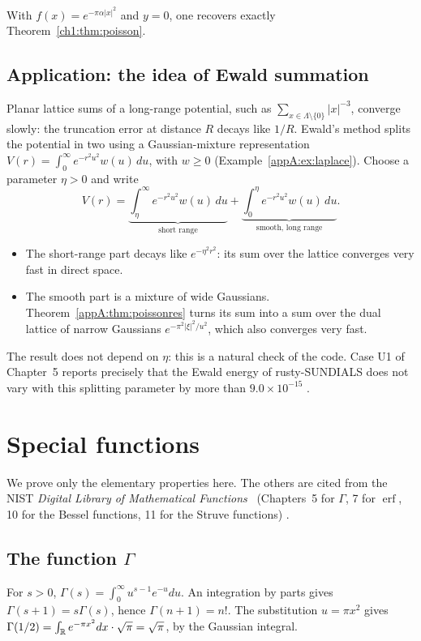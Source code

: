 With $f(x)=e^{-\pi\alpha|x|^2}$ and $y=0$, one recovers exactly Theorem~\ref{ch1:thm:poisson}.

\subsection{Application: the idea of Ewald summation}\label{appA:ssec:ewald}

Planar lattice sums of a long-range potential, such as $\sum_{x\in\Lambda\setminus\{0\}}|x|^{-3}$, converge
slowly: the truncation error at distance $R$ decays like $1/R$. Ewald's method splits the potential in two
using a Gaussian-mixture representation $V(r)=\int_0^\infty e^{-r^2u^2}w(u)\,du$, with $w\ge0$
(Example~\ref{appA:ex:laplace}). Choose a parameter $\eta>0$ and write
\[V(r)=\underbrace{\int_\eta^\infty e^{-r^2u^2}w(u)\,du}_{\text{short range}}+
\underbrace{\int_0^\eta e^{-r^2u^2}w(u)\,du}_{\text{smooth, long range}} .\]
\begin{itemize}
\item The short-range part decays like $e^{-\eta^2r^2}$: its sum over the lattice converges very fast in
direct space.
\item The smooth part is a mixture of wide Gaussians. Theorem~\ref{appA:thm:poissonres} turns its sum
into a sum over the dual lattice of narrow Gaussians $e^{-\pi^2|\xi|^2/u^2}$, which also converges very fast.
\end{itemize}
The result does not depend on $\eta$: this is a natural check of the code. Case U1 of Chapter~5 reports
precisely that the Ewald energy of rusty-SUNDIALS does not vary with this splitting parameter by more than
$9.0\times10^{-15}$ \tierX.

\section{Special functions}\label{appA:sec:speciales}

We prove only the elementary properties here. The others are cited from the NIST \emph{Digital Library of
Mathematical Functions}~\cite{app:dlmf} (Chapters~5 for $\Gamma$, 7 for $\operatorname{erf}$, 10 for the
Bessel functions, 11 for the Struve functions) \tierL.

\subsection{The function \texorpdfstring{$\Gamma$}{Gamma}}
For $s>0$, $\Gamma(s)=\int_0^\infty u^{s-1}e^{-u}du$. An integration by parts gives $\Gamma(s+1)=s\Gamma(s)$, hence
$\Gamma(n+1)=n!$. The substitution $u=\pi x^2$ gives $\Gamma(1/2)=\int_{\mathbb{R}} e^{-\pi x^2}dx\cdot\sqrt\pi=\sqrt\pi$, by
the Gaussian integral.

